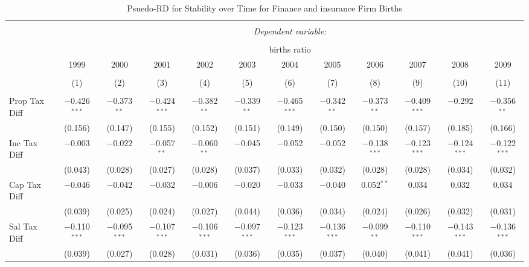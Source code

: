 
\begin{table}[!htbp] \centering 
  \caption{Psuedo-RD for Stability over Time for  Finance and insurance Firm Births} 
  \label{52year} 
\small 
\begin{tabular}{@{\extracolsep{5pt}}lccccccccccc} 
\\[-1.8ex]\hline 
\hline \\[-1.8ex] 
 & \multicolumn{11}{c}{\textit{Dependent variable:}} \\ 
\cline{2-12} 
\\[-1.8ex] & \multicolumn{11}{c}{births ratio} \\ 
 & 1999 & 2000 & 2001 & 2002 & 2003 & 2004 & 2005 & 2006 & 2007 & 2008 & 2009 \\ 
\\[-1.8ex] & (1) & (2) & (3) & (4) & (5) & (6) & (7) & (8) & (9) & (10) & (11)\\ 
\hline \\[-1.8ex] 
 Prop Tax Diff & $-$0.426$^{***}$ & $-$0.373$^{**}$ & $-$0.424$^{***}$ & $-$0.382$^{**}$ & $-$0.339$^{**}$ & $-$0.465$^{***}$ & $-$0.342$^{**}$ & $-$0.373$^{**}$ & $-$0.409$^{***}$ & $-$0.292 & $-$0.356$^{**}$ \\ 
  & (0.156) & (0.147) & (0.155) & (0.152) & (0.151) & (0.149) & (0.150) & (0.150) & (0.157) & (0.185) & (0.166) \\ 
  Inc Tax Diff & $-$0.003 & $-$0.022 & $-$0.057$^{**}$ & $-$0.060$^{**}$ & $-$0.045 & $-$0.052 & $-$0.052 & $-$0.138$^{***}$ & $-$0.123$^{***}$ & $-$0.124$^{***}$ & $-$0.122$^{***}$ \\ 
  & (0.043) & (0.028) & (0.027) & (0.028) & (0.037) & (0.033) & (0.032) & (0.028) & (0.028) & (0.034) & (0.032) \\ 
  Cap Tax Diff & $-$0.046 & $-$0.042 & $-$0.032 & $-$0.006 & $-$0.020 & $-$0.033 & $-$0.040 & 0.052$^{**}$ & 0.034 & 0.032 & 0.034 \\ 
  & (0.039) & (0.025) & (0.024) & (0.027) & (0.044) & (0.036) & (0.034) & (0.024) & (0.026) & (0.032) & (0.031) \\ 
  Sal Tax Diff & $-$0.110$^{***}$ & $-$0.095$^{***}$ & $-$0.107$^{***}$ & $-$0.106$^{***}$ & $-$0.097$^{***}$ & $-$0.123$^{***}$ & $-$0.136$^{***}$ & $-$0.099$^{**}$ & $-$0.110$^{***}$ & $-$0.143$^{***}$ & $-$0.136$^{***}$ \\ 
  & (0.039) & (0.027) & (0.028) & (0.031) & (0.036) & (0.035) & (0.037) & (0.040) & (0.041) & (0.041) & (0.036) \\ 

\end{tabular}
\end{table}
